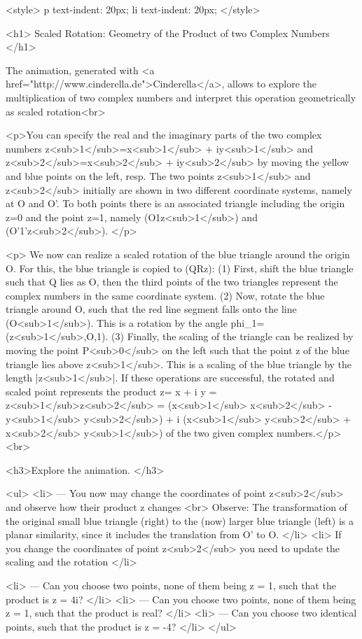 <style>
p {
  text-indent: 20px;
}
li {
  text-indent: 20px;
}
</style>

<h1> Scaled Rotation: Geometry of the Product of two Complex Numbers </h1>

The animation, generated with <a href="http://www.cinderella.de">Cinderella</a>, allows to explore the multiplication of two complex numbers and interpret this operation geometrically as scaled rotation<br> 

<p>You can specify the real and the imaginary parts of the two complex numbers z<sub>1</sub>=x<sub>1</sub> + iy<sub>1</sub> and z<sub>2</sub>=x<sub>2</sub> + iy<sub>2</sub> by moving the yellow and blue points on the left, resp. The two points z<sub>1</sub> and  z<sub>2</sub> initially are shown in two different coordinate systems, namely  at O and O'. To both points there is an associated triangle including the origin z=0 and the point z=1, namely (O1z<sub>1</sub>) and (O'1'z<sub>2</sub>). 
</p>

<p> We now can realize a scaled rotation of the blue triangle around the origin O. For this, the blue triangle is copied to (QRz): (1) First, shift the blue triangle such that Q lies as O, then the third points of the two triangles represent the complex numbers in the same coordinate system. (2) Now, rotate the blue triangle around O, such that the red line segment falls onto the line (O<sub>1</sub>). This is a rotation by the angle phi_1= (z<sub>1</sub>,O,1). (3) Finally, the scaling of the triangle can be realized by moving the point P<sub>0</sub> on the left such that the point z of the blue triangle lies above z<sub>1</sub>. This is a scaling of the blue triangle by the length |z<sub>1</sub>|. If these operations are successful, the rotated and scaled point represents the product z= x + i y = z<sub>1</sub>z<sub>2</sub> = (x<sub>1</sub> x<sub>2</sub> -y<sub>1</sub> y<sub>2</sub>) + i (x<sub>1</sub> y<sub>2</sub> + x<sub>2</sub> y<sub>1</sub>) of the two given complex numbers.</p><br>

<h3>Explore the animation. </h3>	
		
		<ul>
		 <li> --- You now may change the coordinates of point z<sub>2</sub> and observe how their product z changes <br>
		  Observe: The transformation of the original small blue triangle (right) to the (now) larger blue triangle (left) is a planar similarity, since it includes the translation from O' to O. </li>
		<li> If you change the coordinates of point z<sub>2</sub> you need to update the scaling and the rotation </li>
		
		  <li> --- Can you choose two points, none of them being z = 1, such that the product is z = 4i? </li>
		  <li> --- Can you choose two points, none of them being z = 1, such that the product is real? </li>
		  <li> --- Can you choose two identical points, such that the product is z = -4? </li>
		</ul>
